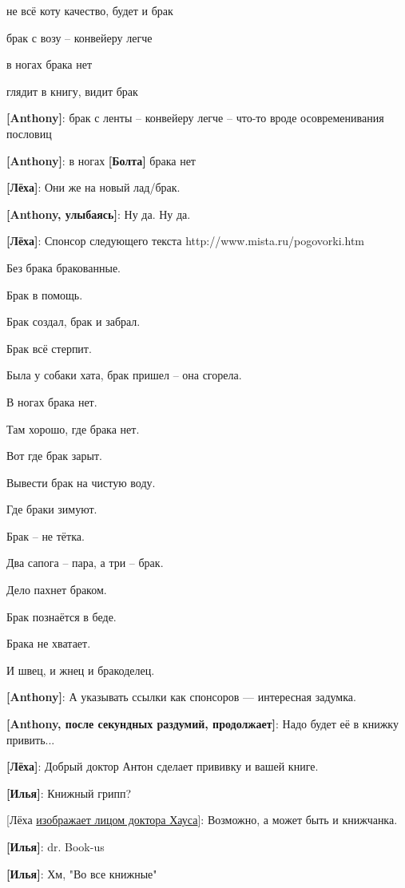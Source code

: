 \begin{flushleft}
не всё коту качество, будет и брак

брак с возу -- конвейеру легче

в ногах брака нет

глядит в книгу, видит брак

\textbf{[Anthony]}: брак с ленты -- конвейеру легче -- что-то вроде осовременивания пословиц

\textbf{[Anthony]}: в ногах \textbf{[Болта]} брака нет

\textbf{[Лёха]}: Они же на новый лад/брак.

\textbf{[Anthony, улыбаясь]}: Ну да. Ну да.

\textbf{[Лёха]}: Спонсор следующего текста http://www.mista.ru/pogovorki.htm

Без брака бракованные.

Брак в помощь.

Брак создал, брак и забрал.

Брак всё стерпит.

Была у собаки хата, брак пришел -- она сгорела.

В ногах брака нет.

Там хорошо, где брака нет.

Вот где брак зарыт.

Вывести брак на чистую воду.

Где браки зимуют.

Брак -- не тётка.

Два сапога -- пара, а три -- брак.

Дело пахнет браком.

Брак познаётся в беде.

Брака не хватает.

И швец, и жнец и бракоделец.

\textbf{[Anthony]}: А указывать ссылки как спонсоров --- интересная задумка.

\textbf{[Anthony, после секундных раздумий, продолжает]}: Надо будет её в книжку привить...

\textbf{[Лёха]}: Добрый доктор Антон сделает прививку и вашей книге.

\textbf{[Илья]}: Книжный грипп?

[Лёха \href{http://i5.imageban.ru/out/2014/09/04/442aff271469c9b3f514584819fcc35c.jpg}{изображает лицом доктора Хауса}]: Возможно, а может быть и книжчанка.

\textbf{[Илья]}: dr. Book-us

\textbf{[Илья]}: Хм, "Во все книжные"


\end{flushleft}
